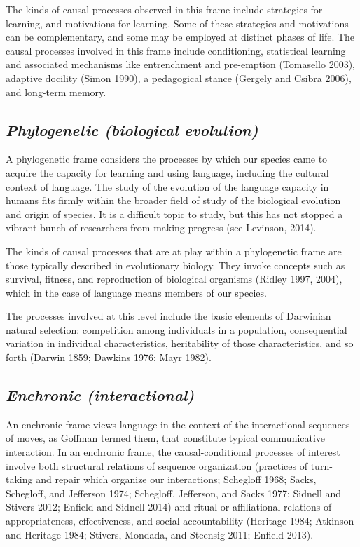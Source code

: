 The kinds of causal processes observed in this frame include strategies 
for learning, and motivations for learning. Some of these strategies and 
motivations can be complementary, and some may be employed at distinct 
phases of life. The causal processes involved in this frame include 
conditioning, statistical learning and associated mechanisms like 
entrenchment and pre-emption (Tomasello 2003), adaptive docility (Simon 
1990), a pedagogical stance (Gergely and Csibra 2006), and long-term 
memory.



\subsection{\textit{Phylogenetic (biological evolution)}}



A phylogenetic frame considers the processes by which our species came 
to acquire the capacity for learning and using language, including the 
cultural context of language. The study of the evolution of the language 
capacity in humans fits firmly within the broader field of study of the 
biological evolution and origin of species. It is a difficult topic to 
study, but this has not stopped a vibrant bunch of researchers from 
making progress (see Levinson, 2014). 



The kinds of causal processes that are at play within a phylogenetic 
frame are those typically described in evolutionary biology. They invoke 
concepts such as survival, fitness, and reproduction of biological 
organisms (Ridley 1997, 2004), which in the case of language means 
members of our species. 



The processes involved at this level include the basic elements of 
Darwinian natural selection: competition among individuals in a 
population, consequential variation in individual characteristics, 
heritability of those characteristics, and so forth (Darwin 1859; 
Dawkins 1976; Mayr 1982).



\subsection{\textit{Enchronic (interactional)}}



An enchronic frame views language in the context of the interactional 
sequences of moves, as Goffman termed them, that constitute typical 
communicative interaction. In an enchronic frame, the causal-conditional 
processes of interest involve both structural relations of sequence 
organization (practices of turn-taking and repair which organize our 
interactions; Schegloff 1968; Sacks, Schegloff, and Jefferson 1974; 
Schegloff, Jefferson, and Sacks 1977; Sidnell and Stivers 2012; Enfield 
and Sidnell 2014) and ritual or affiliational relations of 
appropriateness, effectiveness, and social accountability (Heritage 
1984; Atkinson and Heritage 1984; Stivers, Mondada, and Steensig 2011; 
Enfield 2013). 



